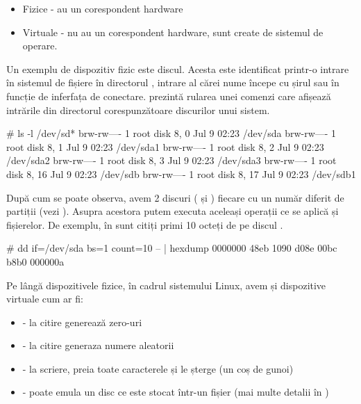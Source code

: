 \begin{itemize}
	\item Fizice - au un corespondent hardware
	\item Virtuale - nu au un corespondent hardware, sunt create de sistemul de operare.
\end{itemize}

Un exemplu de dispozitiv fizic este discul. Acesta este identificat printr-o intrare în sistemul de fișiere în directorul , intrare al cărei nume începe cu șirul 
sau  în funcție de inferfața de conectare.  prezintă rularea unei comenzi care afișează intrările din directorul  corespunzătoare discurilor unui sistem.

\begin{screen}# ls -l /dev/sd*
brw-rw---- 1 root disk 8,  0 Jul  9 02:23 /dev/sda
brw-rw---- 1 root disk 8,  1 Jul  9 02:23 /dev/sda1
brw-rw---- 1 root disk 8,  2 Jul  9 02:23 /dev/sda2
brw-rw---- 1 root disk 8,  3 Jul  9 02:23 /dev/sda3
brw-rw---- 1 root disk 8, 16 Jul  9 02:23 /dev/sdb
brw-rw---- 1 root disk 8, 17 Jul  9 02:23 /dev/sdb1
\end{screen}

După cum se poate observa, avem 2 discuri ( și ) fiecare cu
un număr diferit de partiții (vezi ).
Asupra acestora putem executa aceleași operații ce se aplică și fișierelor. De exemplu, în  sunt citiți primi 10 octeți de pe discul .

\begin{screen}# dd if=/dev/sda bs=1 count=10 -- | hexdump
0000000 48eb 1090 d08e 00bc b8b0
000000a
\end{screen}

Pe lângă dispozitivele fizice, în cadrul sistemului Linux, avem și dispozitive
virtuale cum ar fi:

\begin{itemize}
	\item {} - la citire generează zero-uri
	\item {} - la citire generaza numere aleatorii
	\item {} - la scriere, preia toate caracterele și le
		șterge (un coș de gunoi)
	\item {} - poate emula un disc ce este stocat într-un
		fișier (mai multe detalii în
		)
\end{itemize}

